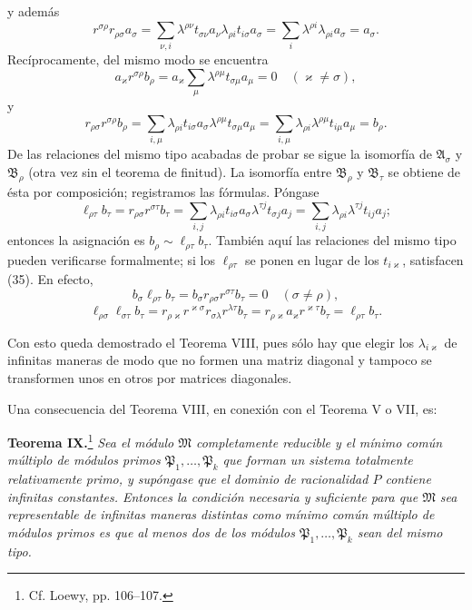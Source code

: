 \documentclass[11pt]{article}
\begin{document}
y además
\[
 r^{\sigma\rho}r_{\rho\sigma}a_\sigma
 =\sum_{\nu,i}\lambda^{\rho\nu}t_{\sigma\nu}a_\nu\lambda_{\rho i}t_{i\sigma}a_\sigma
 =\sum_i\lambda^{\rho i}\lambda_{\rho i}a_\sigma=a_\sigma.
\]
Recíprocamente, del mismo modo se encuentra
\[
 a_\varkappa r^{\sigma\rho}b_\rho
 =a_\varkappa\sum_\mu\lambda^{\rho\mu}t_{\sigma\mu}a_\mu=0
 \quad(\varkappa\ne\sigma),
\]
y
\[
 r_{\rho\sigma}r^{\sigma\rho}b_\rho
 =\sum_{i,\mu}\lambda_{\rho i}t_{i\sigma}a_\sigma\lambda^{\rho\mu}t_{\sigma\mu}a_\mu
 =\sum_{i,\mu}\lambda_{\rho i}\lambda^{\rho\mu}t_{i\mu}a_\mu=b_\rho.
\]
De las relaciones del mismo tipo acabadas de probar se sigue la isomorfía de $\mathfrak A_\sigma$ y $\mathfrak B_\rho$ (otra vez sin el teorema de finitud). La isomorfía entre $\mathfrak B_\rho$ y $\mathfrak B_\tau$ se obtiene de ésta por composición; registramos las fórmulas. Póngase
\[
 \ell_{\rho\tau}b_\tau=r_{\rho\sigma}r^{\sigma\tau}b_\tau
 =\sum_{i,j}\lambda_{\rho i}t_{i\sigma}a_\sigma\lambda^{\tau j}t_{\sigma j}a_j
 =\sum_{i,j}\lambda_{\rho i}\lambda^{\tau j}t_{ij}a_j;
\]
entonces la asignación es $b_\rho\sim\ell_{\rho\tau}b_\tau$. También aquí las relaciones del mismo tipo pueden verificarse formalmente; si los $\ell_{\rho\tau}$ se ponen en lugar de los $t_{i\varkappa}$, satisfacen (35). En efecto,
\[
 b_\sigma\ell_{\rho\tau}b_\tau=b_\sigma r_{\rho\sigma}r^{\sigma\tau}b_\tau=0\quad(\sigma\ne\rho),
\]
\[
 \ell_{\rho\sigma}\ell_{\sigma\tau}b_\tau=r_{\rho\varkappa}r^{\varkappa\sigma}r_{\sigma\lambda}r^{\lambda\tau}b_\tau
 =r_{\rho\varkappa}a_\varkappa r^{\varkappa\tau}b_\tau=\ell_{\rho\tau}b_\tau.
\]

Con esto queda demostrado el Teorema VIII, pues sólo hay que elegir los $\lambda_{i\varkappa}$ de infinitas maneras de modo que no formen una matriz diagonal y tampoco se transformen unos en otros por matrices diagonales.

Una consecuencia del Teorema VIII, en conexión con el Teorema V o VII, es:

\textbf{Teorema IX.}\footnote{Cf. Loewy, pp. 106--107.} \emph{Sea el módulo $\mathfrak M$ completamente reducible y el mínimo común múltiplo de módulos primos $\mathfrak P_1,\ldots,\mathfrak P_k$ que forman un sistema totalmente relativamente primo, y supóngase que el dominio de racionalidad $P$ contiene infinitas constantes. Entonces la condición necesaria y suficiente para que $\mathfrak M$ sea representable de infinitas maneras distintas como mínimo común múltiplo de módulos primos es que al menos dos de los módulos $\mathfrak P_1,\ldots,\mathfrak P_k$ sean del mismo tipo.}
\end{document}
